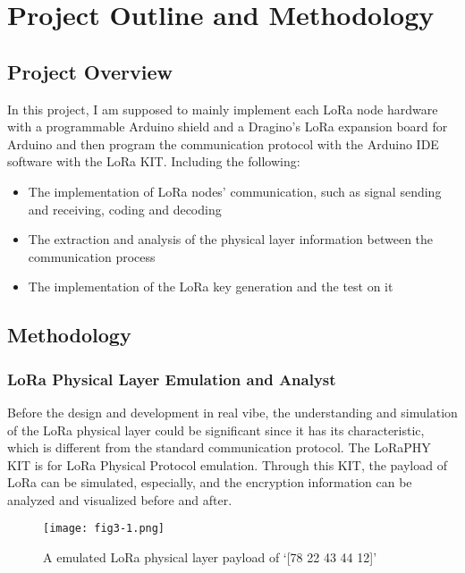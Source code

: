 
\chapter{Project Outline and Methodology}

\section{Project Overview}
In this project, I am supposed to mainly implement each LoRa node hardware with a programmable Arduino shield and a Dragino’s LoRa expansion board for Arduino and then program the communication protocol with the Arduino IDE software with the LoRa KIT. Including the following:
\begin{itemize}
\item The implementation of LoRa nodes’ communication, such as signal sending and receiving, coding and decoding
\item The extraction and analysis of the physical layer information between the communication process
\item The implementation of the LoRa key generation and the test on it
\end{itemize}

\section{Methodology}
\subsection{LoRa Physical Layer Emulation and Analyst}
Before the design and development in real vibe, the understanding and simulation of the LoRa physical layer could be significant since it has its characteristic, which is different from the standard communication protocol.
The LoRaPHY KIT is for LoRa Physical Protocol emulation\cite{10.1145/3546869}. Through this KIT, the payload of LoRa can be simulated, especially, and the encryption information can be analyzed and visualized before and after.
\begin{figure}
  \centering
  \texttt{[image: fig3-1.png]}
  \caption{A emulated LoRa physical layer payload of ‘[78 22 43 44 12]’}
  \label{fig:3-1}
\end{figure}

